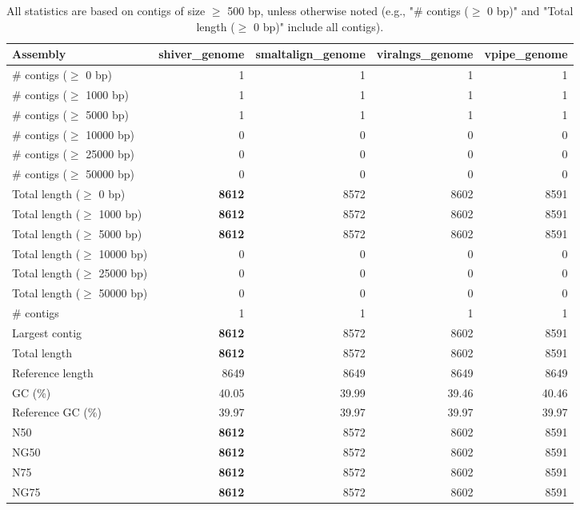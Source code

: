 \documentclass[12pt,a4paper]{article}
\begin{document}
\begin{table}[ht]
\begin{center}
\caption{All statistics are based on contigs of size $\geq$ 500 bp, unless otherwise noted (e.g., "\# contigs ($\geq$ 0 bp)" and "Total length ($\geq$ 0 bp)" include all contigs).}
\begin{tabular}{|l*{4}{|r}|}
\hline
Assembly & shiver\_genome & smaltalign\_genome & viralngs\_genome & vpipe\_genome \\ \hline
\# contigs ($\geq$ 0 bp) & 1 & 1 & 1 & 1 \\ \hline
\# contigs ($\geq$ 1000 bp) & 1 & 1 & 1 & 1 \\ \hline
\# contigs ($\geq$ 5000 bp) & 1 & 1 & 1 & 1 \\ \hline
\# contigs ($\geq$ 10000 bp) & 0 & 0 & 0 & 0 \\ \hline
\# contigs ($\geq$ 25000 bp) & 0 & 0 & 0 & 0 \\ \hline
\# contigs ($\geq$ 50000 bp) & 0 & 0 & 0 & 0 \\ \hline
Total length ($\geq$ 0 bp) & {\bf 8612} & 8572 & 8602 & 8591 \\ \hline
Total length ($\geq$ 1000 bp) & {\bf 8612} & 8572 & 8602 & 8591 \\ \hline
Total length ($\geq$ 5000 bp) & {\bf 8612} & 8572 & 8602 & 8591 \\ \hline
Total length ($\geq$ 10000 bp) & 0 & 0 & 0 & 0 \\ \hline
Total length ($\geq$ 25000 bp) & 0 & 0 & 0 & 0 \\ \hline
Total length ($\geq$ 50000 bp) & 0 & 0 & 0 & 0 \\ \hline
\# contigs & 1 & 1 & 1 & 1 \\ \hline
Largest contig & {\bf 8612} & 8572 & 8602 & 8591 \\ \hline
Total length & {\bf 8612} & 8572 & 8602 & 8591 \\ \hline
Reference length & 8649 & 8649 & 8649 & 8649 \\ \hline
GC (\%) & 40.05 & 39.99 & 39.46 & 40.46 \\ \hline
Reference GC (\%) & 39.97 & 39.97 & 39.97 & 39.97 \\ \hline
N50 & {\bf 8612} & 8572 & 8602 & 8591 \\ \hline
NG50 & {\bf 8612} & 8572 & 8602 & 8591 \\ \hline
N75 & {\bf 8612} & 8572 & 8602 & 8591 \\ \hline
NG75 & {\bf 8612} & 8572 & 8602 & 8591 \\ \hline

\end{tabular}
\end{center}
\end{table}
\end{document}
